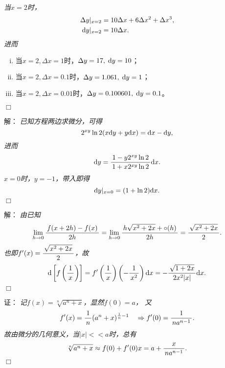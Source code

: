\begin{frame}
	\linespread{1.5}
	
	\small\it 当$x=2$时，
	\begin{align*}
		\Delta y|_{x=2}&
		=10\Delta x+6\Delta x^2+\Delta x^3,\\
		\mathrm{d} y|_{x=2}&=10\Delta x.
	\end{align*}
	\pause 进而
	\begin{enumerate}[(i)]
	  \item 当$x=2,\Delta x=1$时，$\Delta y=17,\;\mathrm{d} y=10$；
	  \item 当$x=2,\Delta x=0.1$时，$\Delta y=1.061,\;\mathrm{d} y=1$；
	  \item 当$x=2,\Delta x=0.01$时，$\Delta y=0.100601,\;\mathrm{d} y=0.1$。
	\end{enumerate}
	\hfill$\Box$
\end{frame}

\begin{frame}
	\linespread{1.5}
	\pause
	
	\bigskip
	
	\small 解：\it 
	已知方程两边求微分，可得
	$$2^{xy}\ln2(x\mathrm{d} y+y\mathrm{d} x)=\mathrm{d} x-\mathrm{d} y,$$
	进而
	$$\mathrm{d} y=\displaystyle\frac{\,{1-y2^{xy}\ln2}\,}{\,{1+x2^{xy}\ln2}\,}\mathrm{d} x.$$
	\pause $x=0$时，$y=-1$，带入即得
	$$\mathrm{d} y|_{x=0}=(1+\ln2)\mathrm{d} x.$$
	\hfill$\Box$
\end{frame}

\begin{frame}
	\linespread{1.5}
	\pause

	\bigskip
	
	\small 解： \it 
	由已知
	$$\lim\limits_{h\to0}\displaystyle\frac{\,{f(x+2h)-f(x)}\,}{\,{2h}\,}
	=\lim\limits_{h\to0}\displaystyle\frac{\,{h\sqrt{x^2+2x}+\circ(h)}\,}{\,{2h}\,}
	=\displaystyle\frac{\,{\sqrt{x^2+2x}}\,}{\,{2}\,}.
	$$
	也即$f'(x)=\displaystyle\frac{\,{\sqrt{x^2+2x}}\,}{\,{2}\,}$，\pause 故
	$$\mathrm{d}\left[f\left(\displaystyle\frac{\,{1}\,}{\,{x}\,}\right)\right]
	=f'\left(\displaystyle\frac{\,{1}\,}{\,{x}\,}\right)\left(-\displaystyle\frac{\,{1}\,}{\,{x^2}\,}\right)\mathrm{d} x
	=-\displaystyle\frac{\,{\sqrt{1+2x}}\,}{\,{2x^2|x|}\,}\mathrm{d} x.$$
	\hfill$\Box$
\end{frame}

\begin{frame}
	\linespread{1.5}
	\pause
	
	\bigskip
	
	\small 证：\it
	记$f(x)=\sqrt[n]{a^n+x}$，显然$f(0)=a$，
	又
	$$f'(x)=\displaystyle\frac{\,{1}\,}{\,{n}\,}(a^n+x)^{\frac1n-1}\quad
	\Rightarrow f'(0)=\displaystyle\frac{\,{1}\,}{\,{na^{n-1}}\,}.
	$$
	故由微分的几何意义，当$|x|<<a$时，总有
	$$\sqrt[n]{a^n+x}\approx f(0)+f'(0)x
	=a+\displaystyle\frac{\,{x}\,}{\,{na^{n-1}}\,}.$$
	\hfill$\Box$
\end{frame}

